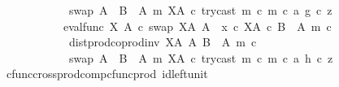 \begin{isabellebody}
\ \ \ \ \ \ \ \ \ \ \ \ swap\ {\isacharparenleft}{\kern0pt}A\ {\isasymCoprod}\ {\isacharparenleft}{\kern0pt}B\ {\isasymsetminus}\ {\isacharparenleft}{\kern0pt}A{\isacharcomma}{\kern0pt}\ m{\isacharparenright}{\kern0pt}{\isacharparenright}{\kern0pt}{\isacharparenright}{\kern0pt}\ {\isacharparenleft}{\kern0pt}X\isactrlbsup A\isactrlesup {\isacharparenright}{\kern0pt}\ {\isasymcirc}\isactrlsub c\ {\isasymlangle}try{\isacharunderscore}{\kern0pt}cast\ m\ {\isasymcirc}\isactrlsub c\ m\ {\isasymcirc}\isactrlsub c\ a{\isacharcomma}{\kern0pt}\ g\ {\isasymcirc}\isactrlsub c\ z{\isasymrangle}\isanewline
\ \ \ \ \ \ \ \ \ \ {\isacharequal}{\kern0pt}\ {\isacharparenleft}{\kern0pt}eval{\isacharunderscore}{\kern0pt}func\ X\ A\ {\isasymcirc}\isactrlsub c\ swap\ {\isacharparenleft}{\kern0pt}X\isactrlbsup A\isactrlesup {\isacharparenright}{\kern0pt}\ A{\isacharparenright}{\kern0pt}\ {\isasymamalg}\ {\isacharparenleft}{\kern0pt}x\ {\isasymcirc}\isactrlsub c\ {\isasymbeta}\isactrlbsub X\isactrlbsup A\isactrlesup \ {\isasymtimes}\isactrlsub c\ {\isacharparenleft}{\kern0pt}B\ {\isasymsetminus}\ {\isacharparenleft}{\kern0pt}A{\isacharcomma}{\kern0pt}\ m{\isacharparenright}{\kern0pt}{\isacharparenright}{\kern0pt}\isactrlesub {\isacharparenright}{\kern0pt}\ {\isasymcirc}\isactrlsub c\isanewline
\ \ \ \ \ \ \ \ \ \ \ \ dist{\isacharunderscore}{\kern0pt}prod{\isacharunderscore}{\kern0pt}coprod{\isacharunderscore}{\kern0pt}inv\ {\isacharparenleft}{\kern0pt}X\isactrlbsup A\isactrlesup {\isacharparenright}{\kern0pt}\ A\ {\isacharparenleft}{\kern0pt}B\ {\isasymsetminus}\ {\isacharparenleft}{\kern0pt}A{\isacharcomma}{\kern0pt}\ m{\isacharparenright}{\kern0pt}{\isacharparenright}{\kern0pt}\ {\isasymcirc}\isactrlsub c\isanewline
\ \ \ \ \ \ \ \ \ \ \ \ swap\ {\isacharparenleft}{\kern0pt}A\ {\isasymCoprod}\ {\isacharparenleft}{\kern0pt}B\ {\isasymsetminus}\ {\isacharparenleft}{\kern0pt}A{\isacharcomma}{\kern0pt}\ m{\isacharparenright}{\kern0pt}{\isacharparenright}{\kern0pt}{\isacharparenright}{\kern0pt}\ {\isacharparenleft}{\kern0pt}X\isactrlbsup A\isactrlesup {\isacharparenright}{\kern0pt}\ {\isasymcirc}\isactrlsub c\ {\isasymlangle}try{\isacharunderscore}{\kern0pt}cast\ m\ {\isasymcirc}\isactrlsub c\ m\ {\isasymcirc}\isactrlsub c\ a{\isacharcomma}{\kern0pt}\ h\ {\isasymcirc}\isactrlsub c\ z{\isasymrangle}{\isachardoublequoteclose}\isanewline
\ \ \ \ \ \ \ \ \ \ \ \ \isamarkupfalse%
\ cfunc{\isacharunderscore}{\kern0pt}cross{\isacharunderscore}{\kern0pt}prod{\isacharunderscore}{\kern0pt}comp{\isacharunderscore}{\kern0pt}cfunc{\isacharunderscore}{\kern0pt}prod\ id{\isacharunderscore}{\kern0pt}left{\isacharunderscore}{\kern0pt}unit{}\ \isamarkupfalse%

\end{isabellebody}
